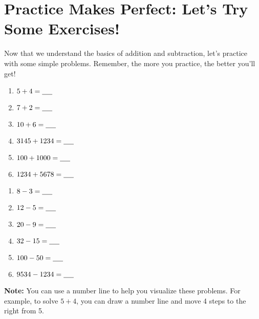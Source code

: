\section{Practice Makes Perfect: Let’s Try Some Exercises!}
Now that we understand the basics of addition and subtraction, let’s practice with some simple problems. Remember, the more you practice, the better you’ll get!
\begin{multicols}{2}
    \begin{enumerate}[label=(\alph*)]
        \item $5 + 4 = \underline{\hspace{0.5cm}}$
        \item $7 + 2 = \underline{\hspace{0.5cm}}$
        \item $10 + 6 = \underline{\hspace{0.5cm}}$
        \item $3145 + 1234 = \underline{\hspace{0.5cm}}$
        \item $100 + 1000 = \underline{\hspace{0.5cm}}$
        \item $1234 + 5678 = \underline{\hspace{0.5cm}}$
    \end{enumerate}
    \begin{enumerate}[label=(\alph*)]
        \item $8 - 3 = \underline{\hspace{0.5cm}}$
        \item $12 - 5 = \underline{\hspace{0.5cm}}$
        \item $20 - 9 = \underline{\hspace{0.5cm}}$
        \item $32 - 15 = \underline{\hspace{0.5cm}}$
        \item $100 - 50 = \underline{\hspace{0.5cm}}$
        \item $9534 - 1234 = \underline{\hspace{0.5cm}}$
    \end{enumerate}
\end{multicols}

\textbf{Note:} You can use a number line to help you visualize these problems. For example, to solve $5 + 4$, you can draw a number line and move 4 steps to the right from 5.
\noindent
\begin{center}
    \end{center}

